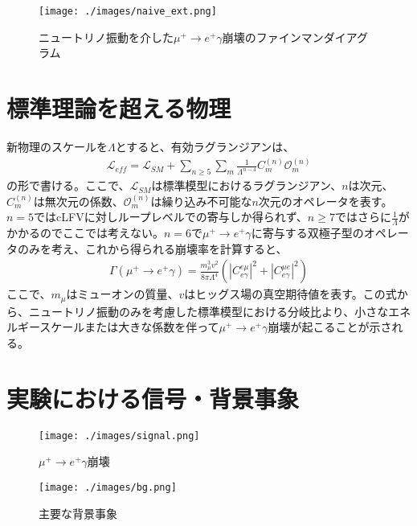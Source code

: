 \documentclass[Yonemoto_master.tex]{subfiles}
\begin{document}
\begin{figure}[h]
\begin{center}
\texttt{[image: ./images/naive\_ext.png]}
\caption{ニュートリノ振動を介した$\mu^+ \to e^+ \gamma$崩壊のファインマンダイアグラム}
\label{fig: naive_ext}
\end{center}
\end{figure}

\section{標準理論を超える物理}

新物理のスケールを$\Lambda$とすると、有効ラグランジアンは、
\begin{align}
\mathcal{L}_{eff} = \mathcal{L}_{SM} + \sum_{n \geq 5} \sum_{m} \frac{1}{\Lambda^{n-4}} C^{(n)}_m \mathcal{O}^{(n)}_m
\end{align}
\noindent の形で書ける\cite{lag_eff}。ここで、$\mathcal{L}_{SM}$は標準模型におけるラグランジアン、$n$は次元、$C^{(n)}_m$は無次元の係数、$\mathcal{O}^{(n)}_m$は繰り込み不可能な$n$次元のオペレータを表す。$n=5$ではcLFVに対しループレベルでの寄与しか得られず、$n \geq 7$ではさらに$\frac{1}{\Lambda}$がかかるのでここでは考えない。$n=6$で$\mu^+ \to e^+ \gamma$に寄与する双極子型のオペレータのみを考え、これから得られる崩壊率を計算すると、
\begin{align}
\Gamma(\mu^+ \to e^+ \gamma) = \frac{m^3_\mu v^2}{8\pi \Lambda^4} (|C^{e\mu}_{e\gamma}|^2 + |C^{\mu e}_{e \gamma}|^2)
\end{align}
\noindent ここで、$m_\mu$はミューオンの質量、$v$はヒッグス場の真空期待値を表す。この式から、ニュートリノ振動のみを考慮した標準模型における分岐比より、小さなエネルギースケールまたは大きな係数を伴って$\mu^+ \to e^+ \gamma$崩壊が起こることが示される。

\section{実験における信号・背景事象}

\begin{figure}[h]
\begin{center}
\texttt{[image: ./images/signal.png]}
\caption{$\mu^+ \to e^+ \gamma$崩壊}
\label{fig: signal}
\end{center}
\end{figure}

\begin{figure}[h]
\begin{center}
\texttt{[image: ./images/bg.png]}
\caption{主要な背景事象}
\label{fig: bgl}
\end{center}
\end{figure}
\end{document}
